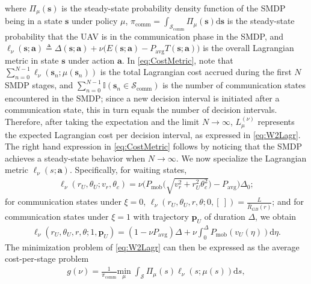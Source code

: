 \documentclass[10pt,twocolumn]{IEEEtran}
\begin{document}
where $\Pi_{\mu}(\mathbf{s})$ is the steady-state probability density function of the SMDP being in a state $\mathbf{s}$ under policy $\mu$, $\pi_{\mathrm{comm}}{=}\int_{\mathcal{S}_{\mathrm{comm}}}\!\!\!\!\!\Pi_{\mu}(\mathbf{s})\mathrm{d}\mathbf{s}$ is the steady-state probability that the UAV is in the communication phase in the SMDP, and $\ell_{\nu}(\mathbf{s};\mathbf{a}){\triangleq}\Delta(\mathbf{s};\mathbf{a}){+}\nu\big(E(\mathbf{s};\mathbf{a}){-}P_{\mathrm{avg}}T(\mathbf{s};\mathbf{a})\big)$ is the overall Lagrangian metric in state $\mathbf{s}$ under action $\mathbf{a}$. In \eqref{eq:CostMetric}, note that $\sum_{n=0}^{N{-}1}\ell_{\nu}(\mathbf{s}_{n};\mu(\mathbf{s}_{n}))$ is the total Lagrangian cost accrued during the first $N$ SMDP stages, and $\sum_{n{=}0}^{N{-}1}\mathbb{I}(\mathbf{s}_{n}{\in}\mathcal{S}_{\mathrm{comm}})$ is the number of communication states encountered in the SMDP; since a new decision interval is initiated after a communication state, this in turn equals the number of decision intervals. Therefore, after taking the expectation and the limit $N{\to}\infty$, $L_{\mu}^{(\nu)}$ represents the expected Lagrangian cost per decision interval, as expressed in \eqref{eq:W2Lagr}. The right hand expression in \eqref{eq:CostMetric} follows by noticing that the SMDP achieves a steady-state behavior when $N\to\infty$. We now specialize the Lagrangian metric $\ell_{\nu}(s;\mathbf{a})$. Specifically, for waiting states,
\begin{align}\label{eq:EllWait}
    \ell_{\nu}(r_{U},\theta_{U};v_{r},\theta_{c}){=}\nu\Big(P_{\mathrm{mob}}\Big(\sqrt{v_{r}^{2}{+}r_{U}^{2}\theta_{c}^{2}}\Big){-}P_{\mathrm{avg}}\Big)\Delta_{0};
\end{align}
for communication states under $\xi{=}0$, $\ell_{\nu}(r_U,\theta_U,r,\theta;0,[\ ])=\frac{L}{\bar{R}_{GB}(r)}$; and for communication states under $\xi{=}1$ with trajectory 
$\mathbf{p}_{U}$ of duration $\Delta$, we obtain
\begin{align*}
    \ell_{\nu}(r_{U}{,}\theta_{U}{,}r{,}\theta{;}1{,}\mathbf{p}_{U}){=}(1{-}\nu P_{\mathrm{avg}})\Delta{+}\nu\int_{0}^{\Delta}P_{\mathrm{mob}}\left(v_{U}(\eta)\right)\mathrm{d}\eta.
\end{align*}
The minimization problem of \eqref{eq:W2Lagr} can then be expressed as the average cost-per-stage problem
\begin{align}\label{eq:TotalGMin}
	g(\nu) = \frac{1}{\pi_{\mathrm{comm}}}\underset{\mu}{\mathrm{min}} \; \int_{\mathcal{S}} \Pi_{\mu}(s) 
	\ell_\nu(s; \mu(s))\mathrm d s,
\end{align}
\end{document}
